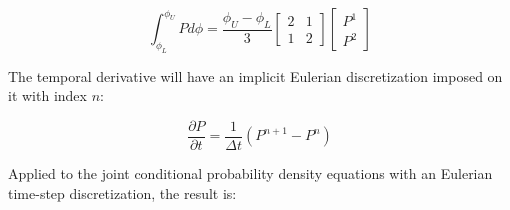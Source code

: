 \documentclass[12pt,a4paper,pagesize=pdftex]{scrartcl}
\begin{document}
\begin{equation*}
    \int_{\phi_L}^{\phi_U} P d\phi = \frac{\phi_U - \phi_L}{3}
    \begin{bmatrix}
        2 & 1\\
        1 & 2
    \end{bmatrix}
    \begin{bmatrix}
        P^1 \\
        P^2
    \end{bmatrix}
\end{equation*}

The temporal derivative will have an implicit Eulerian discretization imposed on it with index \(n\):

\begin{equation*}
    \frac{\partial P}{\partial t} = \frac{1}{\Delta t} \left(P^{n+1} - P^n\right)
\end{equation*}

Applied to the joint conditional probability density equations with an Eulerian time-step discretization, the result is:
\end{document}
